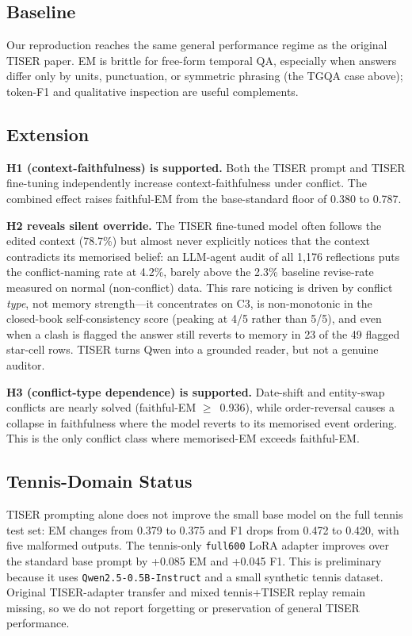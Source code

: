 \documentclass[conference]{IEEEtran}
\begin{document}
\subsection{Baseline}

Our reproduction reaches the same general performance regime as the original TISER paper. EM is brittle for free-form temporal QA, especially when answers differ only by units, punctuation, or symmetric phrasing (the TGQA case above); token-F1 and qualitative inspection are useful complements.

\subsection{Extension}

\textbf{H1 (context-faithfulness) is supported.} Both the TISER prompt and TISER fine-tuning independently increase context-faithfulness under conflict. The combined effect raises faithful-EM from the base-standard floor of 0.380 to 0.787.

\textbf{H2 reveals silent override.} The TISER fine-tuned model often follows the edited context (78.7\%) but almost never explicitly notices that the context contradicts its memorised belief: an LLM-agent audit of all 1,176 reflections puts the conflict-naming rate at 4.2\%, barely above the 2.3\% baseline revise-rate measured on normal (non-conflict) data. This rare noticing is driven by conflict \emph{type}, not memory strength---it concentrates on C3, is non-monotonic in the closed-book self-consistency score (peaking at 4/5 rather than 5/5), and even when a clash is flagged the answer still reverts to memory in 23 of the 49 flagged star-cell rows. TISER turns Qwen into a grounded reader, but not a genuine auditor.

\textbf{H3 (conflict-type dependence) is supported.} Date-shift and entity-swap conflicts are nearly solved (faithful-EM $\geq$~0.936), while order-reversal causes a collapse in faithfulness where the model reverts to its memorised event ordering. This is the only conflict class where memorised-EM exceeds faithful-EM.

\subsection{Tennis-Domain Status}

TISER prompting alone does not improve the small base model on the full tennis test set: EM changes from 0.379 to 0.375 and F1 drops from 0.472 to 0.420, with five malformed outputs. The tennis-only \texttt{full600} LoRA adapter improves over the standard base prompt by +0.085 EM and +0.045 F1. This is preliminary because it uses \texttt{Qwen2.5-0.5B-Instruct} and a small synthetic tennis dataset. Original TISER-adapter transfer and mixed tennis+TISER replay remain missing, so we do not report forgetting or preservation of general TISER performance.
\end{document}
